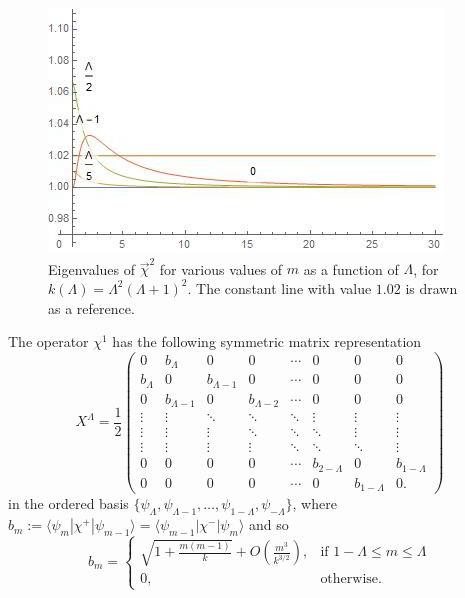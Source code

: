 \begin{figure}
    \centering
    \includegraphics[width = 2\textwidth/3]{images/R^2.jpg}
    \caption{Eigenvalues of $\vec \chi^2$ for various values of $m$ as a function of $\Lambda$, for $k(\Lambda) = \Lambda^2(\Lambda+1)^2$. The constant line with value $1.02$ is drawn as a reference.}
    \label{fig:R2Chi}
\end{figure}

The operator $\chi^1$ has the following symmetric matrix representation
\begin{equation}
    X^\Lambda = \frac{1}{2} 
    \begin{pmatrix} 
    0 & b_\Lambda & 0 & 0& \cdots & 0& 0 & 0 \\
    b_\Lambda & 0 & b_{\Lambda - 1} & 0 & \cdots & 0 & 0 & 0\\
    0 & b_{\Lambda-1} & 0 & b_{\Lambda - 2} & \cdots & 0 & 0 &0\\
    \vdots & \vdots & \ddots & \ddots & \ddots & \vdots & \vdots & \vdots\\
    \vdots & \vdots & \vdots & \ddots & \ddots & \ddots & \vdots & \vdots\\
    \vdots & \vdots & \vdots & \vdots & \ddots & \ddots & \ddots & \vdots\\
    0 & 0 & 0 & 0 & \cdots & b_{2-\Lambda} & 0 & b_{1-\Lambda}\\
    0 & 0 & 0 &0 & \cdots & 0 & b_{1-\Lambda} & 0.
    \end{pmatrix}                                                                                                                           
\end{equation}
in the ordered basis $\{\psi_\Lambda, \psi_{\Lambda - 1}, \dots, \psi_{1-\Lambda}, \psi_{-\Lambda}\}$, where $b_m := \langle \psi_m | \chi^+ | \psi_{m-1} \rangle = \langle \psi_{m-1} | \chi ^- | \psi_m\rangle$ and so
\begin{equation}\label{equationbmD2}
    b_m = \begin{cases}
        \sqrt{1 + \frac{m(m-1)}{k}} + O\left( \frac{m^3}{k^{3/2}} \right), & \text{if } 1- \Lambda \leq m \leq \Lambda \\
        0, & \text{otherwise}.
    \end{cases}
\end{equation}

